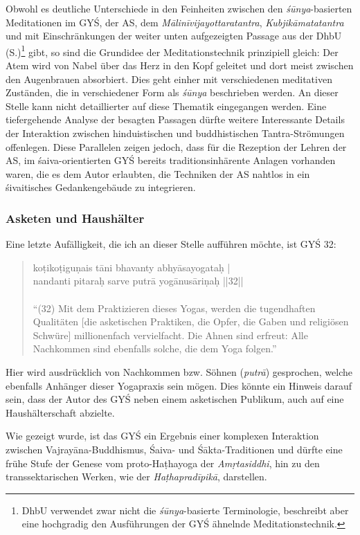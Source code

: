 \documentclass[a4paper,12pt]{article}
\begin{document}
        Obwohl es deutliche Unterschiede in den Feinheiten zwischen den \textit{śūnya}-basierten Meditationen im GYŚ, der AS, dem \textit{Mālinīvijayottaratantra}, \textit{Kubjikāmatatantra} und mit Einschränkungen der weiter unten aufgezeigten Passage aus der DhbU (S.\pageref{dhbu})\footnote{DhbU verwendet zwar nicht die \textit{śūnya}-basierte Terminologie, beschreibt aber eine hochgradig den Ausführungen der GYŚ ähnelnde Meditationstechnik.} gibt, so sind die Grundidee der Meditationstechnik prinzipiell gleich: Der Atem wird von Nabel über das Herz in den Kopf geleitet und dort meist zwischen den Augenbrauen absorbiert. Dies geht einher mit verschiedenen meditativen Zuständen, die in verschiedener Form als \textit{śūnya} beschrieben werden. An dieser Stelle kann nicht detaillierter auf diese Thematik eingegangen werden. Eine tiefergehende Analyse der besagten Passagen dürfte weitere Interessante Details der Interaktion zwischen hinduistischen und buddhistischen Tantra-Strömungen offenlegen. Diese Parallelen zeigen jedoch, dass für die Rezeption der Lehren der AS, im śaiva-orientierten GYŚ bereits traditionsinhärente Anlagen vorhanden waren, die es dem Autor erlaubten, die Techniken der AS nahtlos in ein śivaitisches Gedankengebäude zu integrieren.

\subsubsection{Asketen und Haushälter}
        
       Eine letzte Aufälligkeit, die ich an dieser Stelle aufführen möchte, ist GYŚ 32: \begin{quote} koṭikoṭiguṇais tāni bhavanty abhyāsayogataḥ | \\nandanti pitaraḥ sarve putrā yogānusāriṇaḥ ||32||\\ \\ ``(32) Mit dem Praktizieren dieses Yogas, werden die tugendhaften Qualitäten [die asketischen Praktiken, die Opfer, die Gaben und religiösen Schwüre] millionenfach vervielfacht. Die Ahnen sind erfreut: Alle Nachkommen sind ebenfalls solche, die dem Yoga folgen.''\end{quote} Hier wird ausdrücklich von Nachkommen bzw. Söhnen (\textit{putrā}) gesprochen, welche ebenfalls Anhänger dieser Yogapraxis sein mögen. Dies könnte ein Hinweis darauf sein, dass der Autor des GYŚ neben einem asketischen Publikum, auch auf eine Haushälterschaft abzielte. 
             
 Wie gezeigt wurde, ist das GYŚ ein Ergebnis einer komplexen Interaktion zwischen Vajrayāna-Buddhismus, Śaiva- und Śākta-Traditionen und dürfte eine frühe Stufe der Genese vom proto-Haṭhayoga der \textit{Amṛtasiddhi}, hin zu den transsektarischen Werken, wie der \textit{Haṭhapradīpikā}, darstellen.
\end{document}
